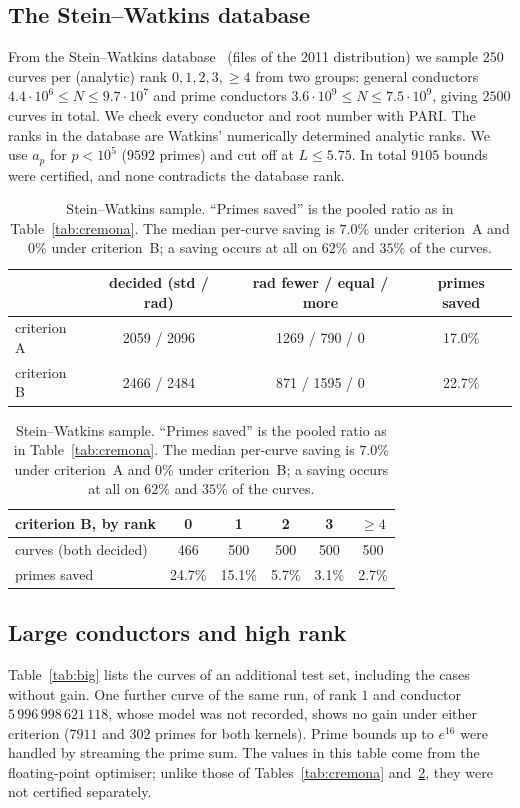 \documentclass[11pt]{amsart}
\theoremstyle{remark}
\theoremstyle{definition}
\begin{document}
\subsection{The Stein--Watkins database}
From the Stein--Watkins database~\cite{SW} (files of the 2011 distribution) we sample $250$ curves per (analytic) rank $0,1,2,3,\ge4$ from two groups: general conductors $4.4\cdot10^6\le N\le9.7\cdot10^7$ and prime conductors $3.6\cdot10^9\le N\le7.5\cdot10^9$, giving $2500$ curves in total. We check every conductor and root number with PARI. The ranks in the database are Watkins' numerically determined analytic ranks. We use $a_p$ for $p<10^5$ ($9592$ primes) and cut off at $L\le5.75$. In total $9105$ bounds were certified, and none contradicts the database rank.

\begin{table}[h]
\centering\small
\begin{tabular}{lccc}
\toprule
 & decided (std / rad) & rad fewer / equal / more & primes saved\\
\midrule
criterion A & 2059 / 2096 & 1269 / \phantom{1}790 / 0 & 17.0\%\\
criterion B & 2466 / 2484 & \phantom{1}871 / 1595 / 0 & 22.7\%\\
\bottomrule
\end{tabular}

\smallskip
\begin{tabular}{lccccc}
\toprule
criterion B, by rank & 0 & 1 & 2 & 3 & $\ge4$\\
\midrule
curves (both decided) & 466 & 500 & 500 & 500 & 500\\
primes saved & 24.7\% & 15.1\% & 5.7\% & 3.1\% & 2.7\%\\
\bottomrule
\end{tabular}
\caption{Stein--Watkins sample. ``Primes saved'' is the pooled ratio as in
Table~\ref{tab:cremona}. The median per-curve saving is $7.0\%$ under criterion~A and $0\%$ under
criterion~B; a saving occurs at all on $62\%$ and $35\%$ of the curves.}
\label{tab:sw}
\end{table}

\subsection{Large conductors and high rank}
Table~\ref{tab:big} lists the curves of an additional test set, including the cases without gain. One further curve of the same run, of rank $1$ and conductor $5\,996\,998\,621\,118$, whose model was not recorded, shows no gain under either criterion ($7911$ and $302$ primes for both kernels). Prime bounds up to $e^{16}$ were handled by streaming the prime sum. The values in this table come from the floating-point optimiser; unlike those of Tables~\ref{tab:cremona} and~\ref{tab:sw}, they were not certified separately.
\end{document}
